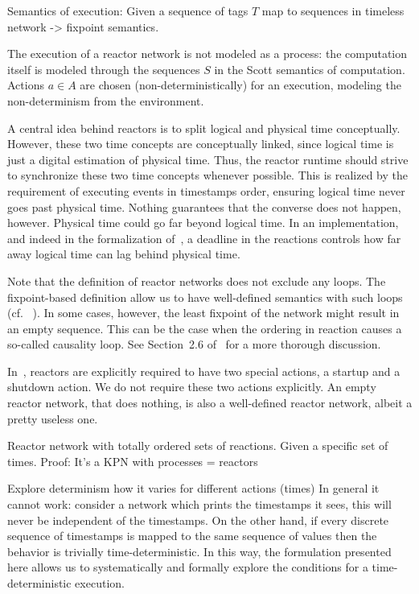Semantics of execution:
Given a sequence of tags $T$ map to sequences in timeless network -> fixpoint semantics.

The execution of a reactor network is not modeled as a process: the computation itself is modeled through the sequences $S$ in the Scott semantics of computation.
Actions $a \in A$ are chosen (non-deterministically) for an execution, modeling the non-determinism from the environment.

A central idea behind reactors is to split logical and physical time conceptually.
However, these two time concepts are conceptually linked, since logical time is just a digital estimation of physical time.
Thus, the reactor runtime should strive to synchronize these two time concepts whenever possible.
This is realized by the requirement of executing events in timestamps order, ensuring logical time never goes past physical time.
Nothing guarantees that the converse does not happen, however.
Physical time could go far beyond logical time.
In an implementation, and indeed in the formalization of~\cite{lohstroh_phdthesis}, a deadline in the reactions controls how far away logical time can lag behind physical time. 

Note that the definition of reactor networks does not exclude any loops.
The fixpoint-based definition allow us to have well-defined semantics with such loops (cf. ~\cite{kahn_74,lee_matsikoudis_semantics}).
In some cases, however, the least fixpoint of the network might result in an empty sequence.
This can be the case when the ordering in reaction causes a so-called causality loop.
See Section~2.6 of~\cite{lohstroh_phdthesis} for a more thorough discussion.

In~\cite{lohstroh_phdthesis}, reactors are explicitly required to have two special actions, a startup and a shutdown action.
We do not require these two actions explicitly.
An empty reactor network, that does nothing, is also a well-defined reactor network, albeit a pretty useless one.

\begin{theorem}
Reactor network with totally ordered sets of reactions.
Given a specific set of times. 
Proof: It's a \ac{KPN} with processes = reactors
\end{theorem}
Explore determinism how it varies for different actions (times)
In general it cannot work: consider a network which prints the timestamps it sees, this will never be independent of the timestamps.
On the other hand, if every discrete sequence of timestamps is mapped to the same sequence of values then the behavior is trivially time-deterministic.
In this way, the formulation presented here allows us to systematically and formally explore the conditions for a time-deterministic execution.


